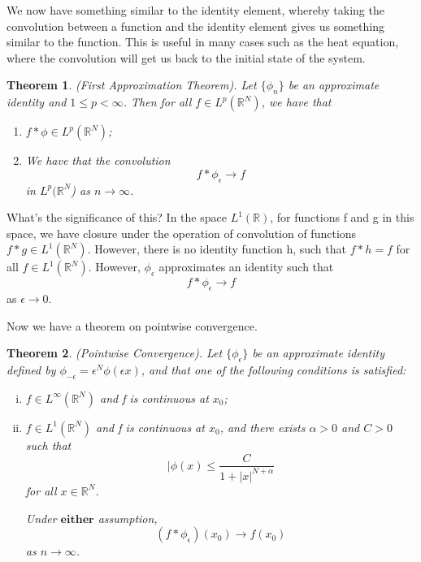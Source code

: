 \documentclass[twoside]{article}
\newcounter{lecnum}
\newtheorem{theorem}{Theorem}[lecnum]
\begin{document}
We now have something similar to the identity element, whereby taking the convolution between a function and the identity element gives us something similar to the function. This is useful in many cases such as the heat equation, where the convolution will get us back to the initial state of the system.

\begin{theorem}(First Approximation Theorem). Let $\{\phi_n\}$ be an approximate identity and $1 \leq p < \infty$. Then for all $f \in L^p(\mathbb{R}^N)$, we have that 

\begin{enumerate}
\item $f * \phi \in L^p(\mathbb{R}^N)$;

\item We have that the convolution $$
f * \phi_{\epsilon} \rightarrow f
$$
in $L^p(\mathbb{R}^N$) as $n \rightarrow \infty$.
\end{enumerate}
\end{theorem}

What's the significance of this? In the space $L^1(\mathbb{R})$, for functions f and g in this space, we have closure under the operation of convolution of functions $f*g \in L^1(\mathbb{R}^N)$. However, there is no identity function h, such that $f*h = f$ for all $f \in L^1(\mathbb{R}^N)$. However, $\phi_{\epsilon}$ approximates an identity such that $$f*\phi_{\epsilon} \rightarrow f$$ as $\epsilon \rightarrow 0$.

Now we have a theorem on pointwise convergence.
\begin{theorem}(Pointwise Convergence). Let $\{\phi_{\epsilon}\}$ be an approximate identity defined by $\phi_{-\epsilon} = \epsilon^N\phi(\epsilon x)$, and that one of the following conditions is satisfied:

\begin{enumerate}[(i)]
  \item $f \in L^{\infty}(\mathbb{R}^N)$ and f is continuous at $x_0$;
  \item $f \in L^{1}(\mathbb{R}^N)$ and f is continuous at $x_0$, and there exists $\alpha > 0$ and $C > 0$ such that
  $$
  |\phi(x) \leq \frac{C}{1 + |x|^{N + \alpha}}
  $$
  for all $x \in \mathbb{R}^N$.

  Under $\textbf{either}$ assumption,
  $$
  (f * \phi_{\epsilon})(x_0) \rightarrow f(x_0)
  $$
  as $n \rightarrow \infty$.
\end{enumerate}
\end{theorem}
\end{document}
